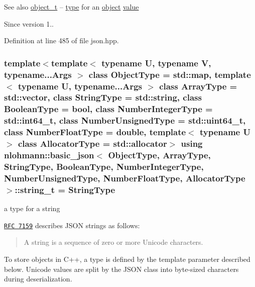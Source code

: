 \begin{DoxySeeAlso}{See also}
\hyperlink{classnlohmann_1_1basic__json_a0ac9894c9de8dc551cf2e5f1c605537f}{object\+\_\+t} -- \hyperlink{classnlohmann_1_1basic__json_a848cbae3bd3502ffbf738320bf5eb3aa}{type} for an \hyperlink{classnlohmann_1_1basic__json_ad25b2f8c21e241e2d63455537a9294ff}{object} \hyperlink{classnlohmann_1_1basic__json_a0a2cbbd95862a623e7dc5c37e67dead0}{value}
\end{DoxySeeAlso}
\begin{DoxySince}{Since}
version 1.. 
\end{DoxySince}


Definition at line 485 of file json.\+hpp.

\hypertarget{classnlohmann_1_1basic__json_ab63e618bbb0371042b1bec17f5891f42}{}
\subsubsection[{string\+\_\+t}]{\setlength{\rightskip}{0pt plus 5cm}template$<$template$<$ typename U, typename V, typename...\+Args $>$ class Object\+Type = std\+::map, template$<$ typename U, typename...\+Args $>$ class Array\+Type = std\+::vector, class String\+Type  = std\+::string, class Boolean\+Type  = bool, class Number\+Integer\+Type  = std\+::int64\+\_\+t, class Number\+Unsigned\+Type  = std\+::uint64\+\_\+t, class Number\+Float\+Type  = double, template$<$ typename U $>$ class Allocator\+Type = std\+::allocator$>$ using {\bf nlohmann\+::basic\+\_\+json}$<$ Object\+Type, Array\+Type, String\+Type, Boolean\+Type, Number\+Integer\+Type, Number\+Unsigned\+Type, Number\+Float\+Type, Allocator\+Type $>$\+::{\bf string\+\_\+t} =  String\+Type}\label{classnlohmann_1_1basic__json_ab63e618bbb0371042b1bec17f5891f42}


a type for a string 

\href{http://rfc7159.net/rfc7159}{\tt R\+F\+C 7159} describes J\+S\+O\+N strings as follows\+: \begin{quote}
A string is a sequence of zero or more Unicode characters. \end{quote}


To store objects in C++, a type is defined by the template parameter described below. Unicode values are split by the J\+S\+O\+N class into byte-\/sized characters during deserialization.


